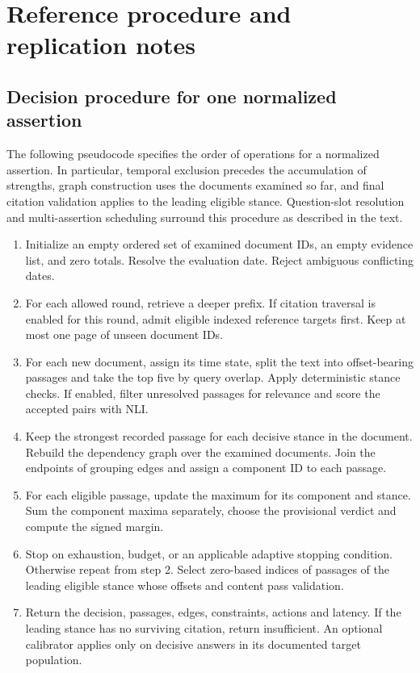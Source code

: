 \appendix
\section{Reference procedure and replication notes}
\subsection{Decision procedure for one normalized assertion}
The following pseudocode specifies the order of operations for a normalized assertion. In particular, temporal exclusion precedes the accumulation of strengths, graph construction uses the documents examined so far, and final citation validation applies to the leading eligible stance. Question-slot resolution and multi-assertion scheduling surround this procedure as described in the text.

\begin{enumerate}[leftmargin=*,label=\arabic*.]
\item Initialize an empty ordered set of examined document IDs, an empty evidence list, and zero totals. Resolve the evaluation date. Reject ambiguous conflicting dates.
\item For each allowed round, retrieve a deeper prefix. If citation traversal is enabled for this round, admit eligible indexed reference targets first. Keep at most one page of unseen document IDs.
\item For each new document, assign its time state, split the text into offset-bearing passages and take the top five by query overlap. Apply deterministic stance checks. If enabled, filter unresolved passages for relevance and score the accepted pairs with NLI.
\item Keep the strongest recorded passage for each decisive stance in the document. Rebuild the dependency graph over the examined documents. Join the endpoints of grouping edges and assign a component ID to each passage.
\item For each eligible passage, update the maximum for its component and stance. Sum the component maxima separately, choose the provisional verdict and compute the signed margin.
\item Stop on exhaustion, budget, or an applicable adaptive stopping condition. Otherwise repeat from step 2. Select zero-based indices of passages of the leading eligible stance whose offsets and content pass validation.
\item Return the decision, passages, edges, constraints, actions and latency. If the leading stance has no surviving citation, return insufficient. An optional calibrator applies only on decisive answers in its documented target population.
\end{enumerate}

